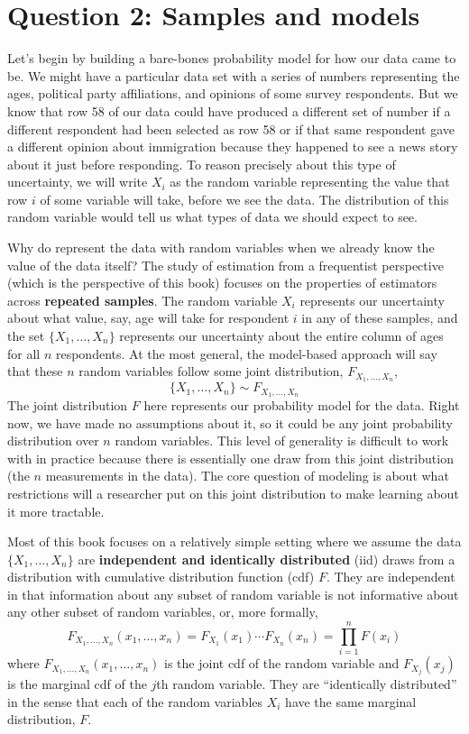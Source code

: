 \documentclass[
  letterpaper,
  DIV=11,
  numbers=noendperiod]{scrreprt}
\theoremstyle{definition}
\theoremstyle{definition}
\theoremstyle{plain}
\theoremstyle{remark}
\begin{document}
\hypertarget{question-2-samples-and-models}{%
\section{Question 2: Samples and
models}\label{question-2-samples-and-models}}

Let's begin by building a bare-bones probability model for how our data
came to be. We might have a particular data set with a series of numbers
representing the ages, political party affiliations, and opinions of
some survey respondents. But we know that row 58 of our data could have
produced a different set of number if a different respondent had been
selected as row 58 or if that same respondent gave a different opinion
about immigration because they happened to see a news story about it
just before responding. To reason precisely about this type of
uncertainty, we will write \(X_i\) as the random variable representing
the value that row \(i\) of some variable will take, before we see the
data. The distribution of this random variable would tell us what types
of data we should expect to see.

Why do represent the data with random variables when we already know the
value of the data itself? The study of estimation from a frequentist
perspective (which is the perspective of this book) focuses on the
properties of estimators across \textbf{repeated samples}. The random
variable \(X_i\) represents our uncertainty about what value, say, age
will take for respondent \(i\) in any of these samples, and the set
\(\{X_{1}, \ldots, X_{n}\}\) represents our uncertainty about the entire
column of ages for all \(n\) respondents. At the most general, the
model-based approach will say that these \(n\) random variables follow
some joint distribution, \(F_{X_{1},\ldots,X_{n}}\), \[
\{X_{1}, \ldots, X_{n}\} \sim F_{X_{1},\ldots,X_{n}}
\] The joint distribution \(F\) here represents our probability model
for the data. Right now, we have made no assumptions about it, so it
could be any joint probability distribution over \(n\) random variables.
This level of generality is difficult to work with in practice because
there is essentially one draw from this joint distribution (the \(n\)
measurements in the data). The core question of modeling is about what
restrictions will a researcher put on this joint distribution to make
learning about it more tractable.

Most of this book focuses on a relatively simple setting where we assume
the data \(\{X_1, \ldots, X_n\}\) are \textbf{independent and
identically distributed} (iid) draws from a distribution with cumulative
distribution function (cdf) \(F\). They are independent in that
information about any subset of random variable is not informative about
any other subset of random variables, or, more formally, \[
F_{X_{1},\ldots,X_{n}}(x_{1}, \ldots, x_{n}) = F_{X_{1}}(x_{1})\cdots F_{X_{n}}(x_{n}) = \prod_{i=1}^n F(x_i)
\] where \(F_{X_{1},\ldots,X_{n}}(x_{1}, \ldots, x_{n})\) is the joint
cdf of the random variable and \(F_{X_{j}}(x_{j})\) is the marginal cdf
of the \(j\)th random variable. They are ``identically distributed'' in
the sense that each of the random variables \(X_i\) have the same
marginal distribution, \(F\).
\end{document}
